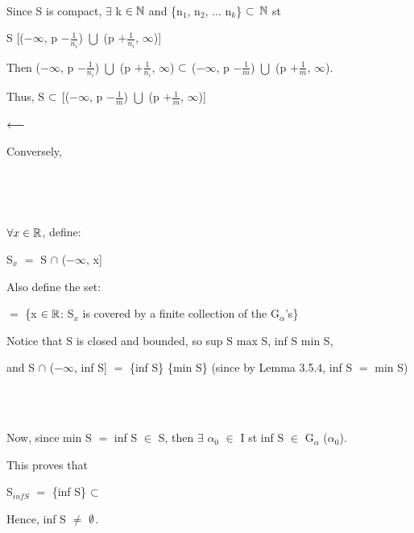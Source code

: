 \documentclass{article}
\begin{document}
{\

Since S is compact, $\exists$ k $\in \mathbb{N}$ and \{n$_1$, n$_2$, ... n$_k$\} $\subset$ $\mathbb{N}$ st \

S \sbs {} [($-\infty$, p $- \frac{1}{n_i}$) $\bigcup$ (p $+ \frac{1}{n_i}$, $\infty$)]


Then ($-\infty$, p $- \frac{1}{n_i}$) $\bigcup$ (p $+ \frac{1}{n_i}$, $\infty$) $\subset$ ($-\infty$, p $- \frac{1}{m}$) $\bigcup$ (p $+ \frac{1}{m}$, $\infty$).

Thus, S $\subset$ [($-\infty$, p $- \frac{1}{m}$) $\bigcup$ (p $+ \frac{1}{m}$, $\infty$)]

$\longleftarrow$ \

Conversely, \
 
 \

 \


$\forall x \in \mathbb{R}$, define:

S$_x$ $=$ S $\cap$ ($-\infty$, x] \

Also define the set:

\bta $=$ \{x $\in \mathbb{R}$: S$_x$ is covered by a finite collection of the G$_\alpha$'s\}

Notice that S is closed and bounded, so sup S \eql max S, inf S \eql min S,

and  \eql S $\cap$ ($-\infty$, inf S] $=$ \{inf S\} \eql \{min S\} (since by Lemma 3.5.4, inf S $=$ min S) \

\

Now, since min S $=$ inf S $\in$ S, then $\exists$ $\alpha_0$ $\in$ I st inf S $\in$ G$_\alpha$ ($\alpha_0$). \

This proves that \

S$_{inf S}$ $=$ \{inf S\} $\subset$ 

Hence, inf S \mt{\in} \bta $\neq$ $\emptyset$. \

\epf

}
\end{document}
